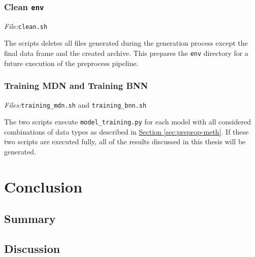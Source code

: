 \documentclass[12pt,a4paper,twoside]{scrartcl}
\numberwithin{equation}{section}
\newcommand{\refsec}[1]{\hyperref[#1]{Section \ref*{#1}}}
\begin{document}
\subsubsection{Clean \texttt{env}}\label{sec:script-clean}
\noindent\emph{File:}\texttt{clean.sh}

The scripts deletes all files generated during the generation process except the final data frame and the created archive. This prepares the \texttt{env} directory for a future execution of the preprocess pipeline.
\subsubsection{Training MDN and Training BNN}\label{sec:script-train}
\noindent\emph{Files:}\texttt{training\_mdn.sh} and \texttt{training\_bnn.sh}

The two scripts execute \texttt{model\_training.py} for each model with all considered combinations of data types as described in \refsec{sec:preprop-meth}. If these two scripts are executed fully, all of the results discussed in this thesis will be generated.
\section{Conclusion}\label{sec:conclusion}
\subsection{Summary}
\subsection{Discussion}
\clearpage
\end{document}
